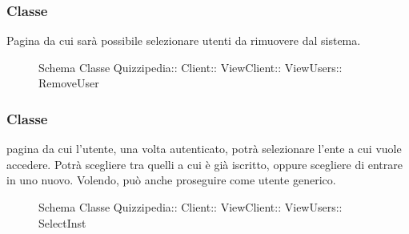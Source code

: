 \subsubsection{Classe }
Pagina da cui sarà possibile selezionare utenti da rimuovere dal sistema.
\begin{figure}[H]
\centering
\noindent{}
\caption[Schema Classe RemoveUser]{Schema Classe Quizzipedia:: Client:: ViewClient:: ViewUsers:: RemoveUser}
\end{figure}
\subsubsection{Classe }
pagina da cui l'utente, una volta autenticato, potrà selezionare l'ente a cui vuole accedere. Potrà scegliere tra quelli a cui è già iscritto, oppure scegliere di entrare in uno nuovo. Volendo, può anche proseguire come utente generico.
\begin{figure}[H]
\centering
\noindent{}
\caption[Schema Classe SelectInst]{Schema Classe Quizzipedia:: Client:: ViewClient:: ViewUsers:: SelectInst}
\end{figure}
